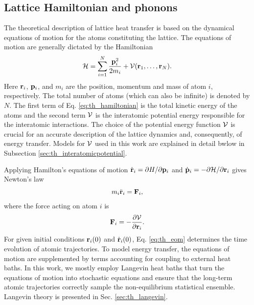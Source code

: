 \subsection{Lattice Hamiltonian and phonons}
\label{sec:th_phonons}

The theoretical description of lattice heat transfer is based on the dynamical equations of motion for the atoms constituting the lattice. The equations of motion are generally dictated by the Hamiltonian \cite{ziman}
\begin{equation}
 \mathcal{H} = \sum_{i=1}^N \frac{\mathbf{p}_i^2}{2m_i} + \mathcal{V}(\mathbf{r}_1,\dots,\mathbf{r}_N). \label{eq:th_hamiltonian}
\end{equation}
Here $\mathbf{r}_i$, $\mathbf{p}_i$, and $m_i$ are the position, momentum and mass of atom $i$, respectively. The total number of atoms (which can also be infinite) is denoted by $N$. The first term of Eq. \eqref{eq:th_hamiltonian} is the total kinetic energy of the atoms and the second term $\mathcal{V}$ is the interatomic potential energy responsible for the interatomic interactions. The choice of the potential energy function $\mathcal{V}$ is crucial for an accurate description of the lattice dynamics and, consequently, of energy transfer. Models for $\mathcal{V}$ used in this work are explained in detail bwlow in Subsection \ref{sec:th_interatomicpotential}.

Applying Hamilton's equations of motion $\dot{\mathbf{r}}_i=\partial H/\partial \mathbf{p}_i$ and $\dot{\mathbf{p}}_i=-\partial \mathcal{H}/\partial \mathbf{r}_i$ \cite{fetter} gives Newton's law
\begin{equation}
 m_i \ddot{\mathbf{r}}_i = \mathbf{F}_i, \label{eq:th_eom}
\end{equation}
where the force acting on atom $i$ is
\begin{equation}
 \mathbf{F}_i = - \frac{\partial \mathcal{V}}{\partial \mathbf{r}_i}. \label{eq:th_force}
\end{equation}
For given initial conditions $\mathbf{r}_i(0)$ and $\dot{\mathbf{r}}_i(0)$, Eq. \eqref{eq:th_eom} determines the time evolution of atomic trajectories. To model energy transfer, the equations of motion are supplemented by terms accounting for coupling to external heat baths. In this work, we mostly employ Langevin heat baths that turn the equations of motion into stochastic equations and ensure that the long-term atomic trajectories correctly sample the non-equilibrium statistical ensemble. Langevin theory is presented in Sec. \ref{sec:th_langevin}.

